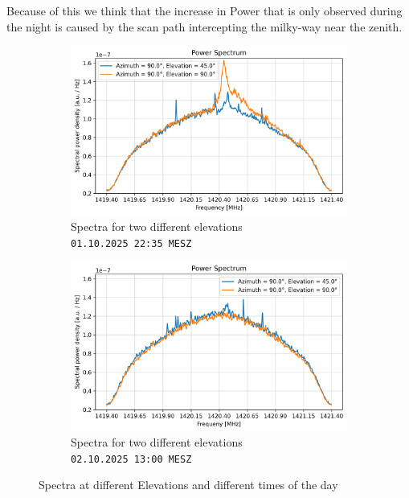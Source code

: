 Because of this we think that the increase in Power that is only observed during the night is caused by the scan path intercepting the milky-way near the zenith.
\begin{figure}[H]
\centering
\begin{subfigure}[t]{0.45\textwidth}
    \centering
    \includegraphics[width=\linewidth]{assets/elev_spectrum_night.png}
    \caption{Spectra for two different elevations\\ \texttt{01.10.2025 22:35 MESZ}}
\end{subfigure}
\begin{subfigure}[t]{0.45\textwidth}
    \centering
    \includegraphics[width=\linewidth]{assets/elev_spectrum_day.png}
    \caption{Spectra for two different elevations\\ \texttt{02.10.2025 13:00 MESZ}}
\end{subfigure}
\caption{Spectra at different Elevations and different times of the day}
\label{fig:elev_spectra}
\end{figure}